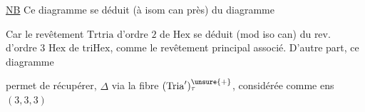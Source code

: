 
\uline{NB} Ce diagramme se déduit (à isom can près) du diagramme


Car le revêtement $\mathrm{Trtria}$ d'ordre $2$ de $\mathrm{Hex}$ se déduit (mod iso can) du rev. d'ordre $3$ $\mathrm{Hex}$ de $\mathrm{triHex}$, comme le revêtement principal associé. D'autre part, ce diagramme


permet de récupérer,   $\Delta$ via la fibre $(\mathrm{Tria}')_{\tau}^{\unsure{+}}$, considérée comme ens $(3,3,3)$


